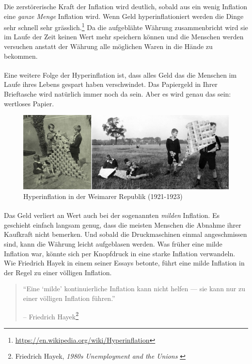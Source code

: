 Die zerstörerische Kraft der Inflation wird deutlich, sobald aus ein wenig
Inflation eine \textit{ganze Menge} Inflation wird. Wenn Geld
hyperinflationiert\cite{wiki:hyperinflation} werden die Dinge sehr schnell sehr
grässlich.\footnote{\url{https://en.wikipedia.org/wiki/Hyperinflation}} Da die
aufgeblähte Währung zusammenbricht wird sie im Laufe der Zeit keinen Wert mehr
speichern können und die Menschen werden versuchen anstatt der Währung alle
möglichen Waren in die Hände zu bekommen.

\paragraph{}
Eine weitere Folge der Hyperinflation ist, dass alles Geld das die Menschen im
Laufe ihres Lebens gespart haben verschwindet. Das Papiergeld in Ihrer
Brieftasche wird natürlich immer noch da sein. Aber es wird genau das sein:
wertloses Papier.

\begin{figure}
  \includegraphics{assets/images/children-playing-with-money.png}
  \caption{Hyperinflation in der Weimarer Republik (1921-1923)}
  \label{fig:children-playing-with-money}
\end{figure}

\paragraph{}
Das Geld verliert an Wert auch bei der sogenannten \textit{milden} Inflation. Es
geschieht einfach langsam genug, dass die meisten Menschen die Abnahme ihrer
Kaufkraft nicht bemerken. Und sobald die Druckmaschinen einmal angeschmissen
sind, kann die Währung leicht aufgeblasen werden. Was früher eine milde
Inflation war, könnte sich per Knopfdruck in eine starke Inflation verwandeln.
Wie Friedrich Hayek in einem seiner Essays betonte, führt eine milde Inflation
in der Regel zu einer völligen Inflation.

\begin{quotation}\begin{samepage}
\enquote{Eine \enquote{milde} kontinuierliche Inflation kann nicht helfen — sie
kann nur zu einer völligen Inflation führen.}
\begin{flushright} -- Friedrich Hayek\footnote{Friedrich Hayek, \textit{1980s
Unemployment and the Unions} \cite{hayek-inflation}}
\end{flushright}\end{samepage}\end{quotation}


